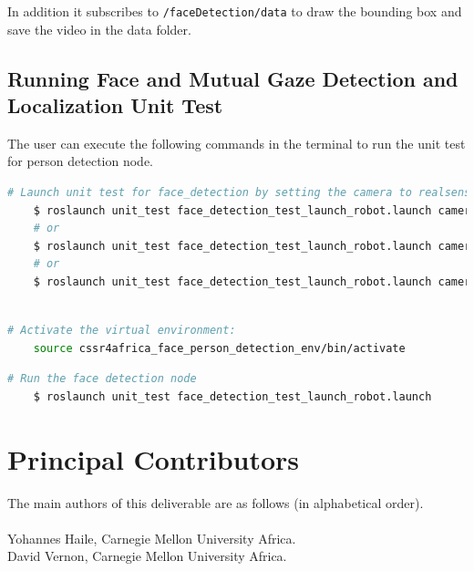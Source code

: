 \documentclass{CSSRforAfrica}
\newcommand{\blank}{~\\}
\begin{document}
{In addition it subscribes to \texttt{/faceDetection/data} to draw the bounding box and save the video in the data folder. 


\subsection*{Running Face and Mutual Gaze Detection and Localization Unit Test}
The user can execute the following commands in the terminal to run the unit test for person detection node. 

\begin{lstlisting}[style=withoutNumbering, language=bash]
	# Launch unit test for face_detection by setting the camera to realsense, pepper or video.
	$ roslaunch unit_test face_detection_test_launch_robot.launch camera:=realsense
	# or
	$ roslaunch unit_test face_detection_test_launch_robot.launch camera:=pepper
	# or 
	$ roslaunch unit_test face_detection_test_launch_robot.launch camera:=video
	
\end{lstlisting}

\begin{lstlisting}[style=withoutNumbering, language=bash]
	# Activate the virtual environment:
	source cssr4africa_face_person_detection_env/bin/activate
\end{lstlisting}

\begin{lstlisting}[style=withoutNumbering, language=bash]
	# Run the face detection node
	$ roslaunch unit_test face_detection_test_launch_robot.launch
\end{lstlisting}

\newpage



\pagebreak
\section*{Principal Contributors}
\label{contributors}
The main authors of this deliverable are as follows (in alphabetical order).
\blank
~
\blank
Yohannes Haile, Carnegie Mellon University Africa.\\    %
David Vernon, Carnegie Mellon University Africa. \\                                                                           %
 

}
\end{document}
